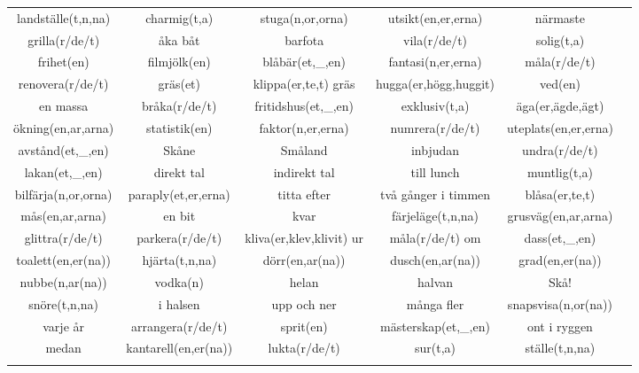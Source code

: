 
\begin{center}
    \begin{adjustwidth}{-2.4cm}{}
        \begin{tabular}{|c c c c c c|}
            \hline
            landställe(t,n,na) & charmig(t,a) & stuga(n,or,orna) & utsikt(en,er,erna) & närmaste &  \\
            grilla(r/de/t) & åka båt & barfota & vila(r/de/t) & solig(t,a) &  \\
            frihet(en) & filmjölk(en) & blåbär(et,\_,en) & fantasi(n,er,erna) & måla(r/de/t) &  \\
            renovera(r/de/t) & gräs(et) & klippa(er,te,t) gräs & hugga(er,högg,huggit) & ved(en) &  \\
            en massa & bråka(r/de/t) & fritidshus(et,\_,en) & exklusiv(t,a) & äga(er,ägde,ägt) &  \\
            ökning(en,ar,arna) & statistik(en) & faktor(n,er,erna) & numrera(r/de/t) & uteplats(en,er,erna) &  \\
            avstånd(et,\_,en) & Skåne & Småland & inbjudan & undra(r/de/t) &  \\
            lakan(et,\_,en) & direkt tal & indirekt tal & till lunch & muntlig(t,a) &  \\
            bilfärja(n,or,orna) & paraply(et,er,erna) & titta efter & två gånger i timmen & blåsa(er,te,t) &  \\
            mås(en,ar,arna) & en bit & kvar & färjeläge(t,n,na) & grusväg(en,ar,arna) &  \\
            glittra(r/de/t) & parkera(r/de/t) & kliva(er,klev,klivit) ur & måla(r/de/t) om & dass(et,\_,en) &  \\
            toalett(en,er(na)) & hjärta(t,n,na) & dörr(en,ar(na)) & dusch(en,ar(na)) & grad(en,er(na)) &  \\
            nubbe(n,ar(na)) & vodka(n) & helan & halvan & Skå! &  \\
            snöre(t,n,na) & i halsen & upp och ner & många fler & snapsvisa(n,or(na)) &  \\
            varje år & arrangera(r/de/t) & sprit(en) & mästerskap(et,\_,en) & ont i ryggen &  \\
            medan & kantarell(en,er(na)) & lukta(r/de/t) & sur(t,a) & ställe(t,n,na) &  \\
             &  &  &  &  &  \\

\end{tabular}
\end{adjustwidth}
\end{center}
